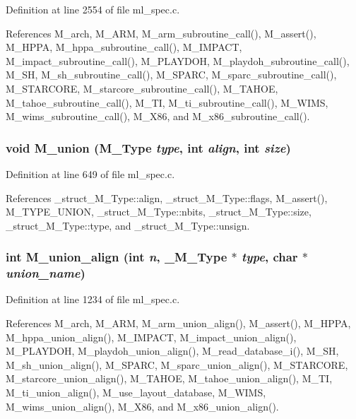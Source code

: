 Definition at line 2554 of file ml\_\-spec.c.

References M\_\-arch, M\_\-ARM, M\_\-arm\_\-subroutine\_\-call(), M\_\-assert(), M\_\-HPPA, M\_\-hppa\_\-subroutine\_\-call(), M\_\-IMPACT, M\_\-impact\_\-subroutine\_\-call(), M\_\-PLAYDOH, M\_\-playdoh\_\-subroutine\_\-call(), M\_\-SH, M\_\-sh\_\-subroutine\_\-call(), M\_\-SPARC, M\_\-sparc\_\-subroutine\_\-call(), M\_\-STARCORE, M\_\-starcore\_\-subroutine\_\-call(), M\_\-TAHOE, M\_\-tahoe\_\-subroutine\_\-call(), M\_\-TI, M\_\-ti\_\-subroutine\_\-call(), M\_\-WIMS, M\_\-wims\_\-subroutine\_\-call(), M\_\-X86, and M\_\-x86\_\-subroutine\_\-call().
\subsubsection{\setlength{\rightskip}{0pt plus 5cm}void M\_\-union (\bf{M\_\-Type} {\em type}, int {\em align}, int {\em size})}\label{ml__spec_8c_5a5989f679ee7ae2980b6580da234a1d}




Definition at line 649 of file ml\_\-spec.c.

References \_\-struct\_\-M\_\-Type::align, \_\-struct\_\-M\_\-Type::flags, M\_\-assert(), M\_\-TYPE\_\-UNION, \_\-struct\_\-M\_\-Type::nbits, \_\-struct\_\-M\_\-Type::size, \_\-struct\_\-M\_\-Type::type, and \_\-struct\_\-M\_\-Type::unsign.
\subsubsection{\setlength{\rightskip}{0pt plus 5cm}int M\_\-union\_\-align (int {\em n}, \bf{\_\-M\_\-Type} $\ast$ {\em type}, char $\ast$ {\em union\_\-name})}\label{ml__spec_8c_29fb59ad7c2b4e258ec3053dbfd716e8}




Definition at line 1234 of file ml\_\-spec.c.

References M\_\-arch, M\_\-ARM, M\_\-arm\_\-union\_\-align(), M\_\-assert(), M\_\-HPPA, M\_\-hppa\_\-union\_\-align(), M\_\-IMPACT, M\_\-impact\_\-union\_\-align(), M\_\-PLAYDOH, M\_\-playdoh\_\-union\_\-align(), M\_\-read\_\-database\_\-i(), M\_\-SH, M\_\-sh\_\-union\_\-align(), M\_\-SPARC, M\_\-sparc\_\-union\_\-align(), M\_\-STARCORE, M\_\-starcore\_\-union\_\-align(), M\_\-TAHOE, M\_\-tahoe\_\-union\_\-align(), M\_\-TI, M\_\-ti\_\-union\_\-align(), M\_\-use\_\-layout\_\-database, M\_\-WIMS, M\_\-wims\_\-union\_\-align(), M\_\-X86, and M\_\-x86\_\-union\_\-align().
